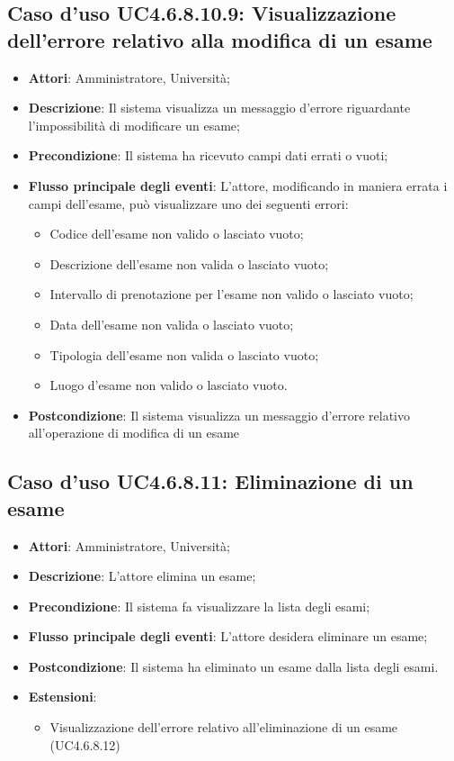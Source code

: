 \subsection{Caso d'uso \texorpdfstring{UC4.6.8.10.9}{UC4.6.8.10.9}: Visualizzazione dell'errore relativo alla modifica di un esame}
\begin{itemize}
\item \textbf{Attori}: Amministratore, Università;
\item \textbf{Descrizione}: Il sistema visualizza un messaggio d'errore riguardante l'impossibilità di modificare un esame;

\item \textbf{Precondizione}: Il sistema ha ricevuto campi dati errati o vuoti;


\item \textbf{Flusso principale degli eventi}: L'attore, modificando in maniera errata i campi dell'esame, può visualizzare uno dei seguenti errori: \begin{itemize} 
\item Codice dell’esame non valido o lasciato vuoto; 
\item Descrizione dell’esame non valida o lasciato vuoto; 
\item Intervallo di prenotazione per l’esame non valido o lasciato vuoto; 
\item Data dell’esame non valida o lasciato vuoto; 
\item Tipologia dell’esame non valida o lasciato vuoto; 
\item Luogo d’esame non valido o lasciato vuoto.
\end{itemize}
\item \textbf{Postcondizione}: Il sistema visualizza un messaggio d'errore relativo all'operazione di modifica di un esame


\end{itemize}
\subsection{Caso d'uso \texorpdfstring{UC4.6.8.11}{UC4.6.8.11}: Eliminazione di un esame}
\begin{itemize}
\item \textbf{Attori}: Amministratore, Università;
\item \textbf{Descrizione}: L'attore elimina un esame;

\item \textbf{Precondizione}: Il sistema fa visualizzare la lista degli esami;

\item \textbf{Flusso principale degli eventi}: L'attore desidera eliminare un esame;

\item \textbf{Postcondizione}: Il sistema ha eliminato un esame dalla lista degli esami.

\item \textbf{Estensioni}:
\begin{itemize}
\item Visualizzazione dell'errore relativo all'eliminazione di un esame (UC4.6.8.12)
\end{itemize}
\end{itemize}
